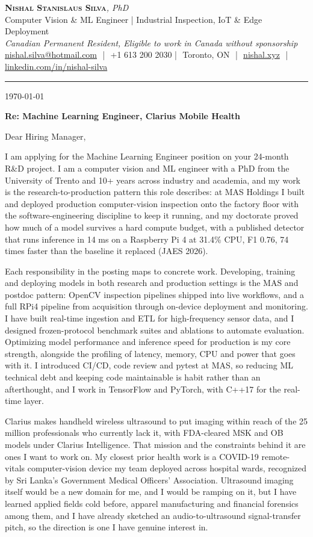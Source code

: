 \documentclass[11pt]{article}
\makeatletter
\newcommand{\clName}{Nishal Stanislaus Silva}
\newcommand{\clEmail}{nishal.silva@hotmail.com}
\newcommand{\clPhone}{+1 613 200 2030}
\newcommand{\clCity}{Toronto, ON}
\newcommand{\clSite}{https://nishal.xyz}
\newcommand{\clLinkedIn}{https://www.linkedin.com/in/nishal-silva}
\newcommand{\clStatus}{Canadian Permanent Resident, Eligible to work in Canada without sponsorship}
\newcommand{\clTagline}{Computer Vision \& ML Engineer | Industrial Inspection, IoT \& Edge Deployment}
\newcommand{\clRole}{Machine Learning Engineer}
\newcommand{\clCompany}{Clarius Mobile Health}
\newcommand{\clAddressee}{Dear Hiring Manager,}
\makeatother
\begin{document}
\pagestyle{empty}
\begin{center}
    {\LARGE \scshape \textbf{\clName}}{\large \textit{, PhD}}\\[1pt]
    {\small \clTagline}\\[1pt]
    {\footnotesize\textit{\clStatus}}\\[1pt]
    {\small
    \href{mailto:\clEmail}{\clEmail} \,\,|\,\, \clPhone \,\,|\,\, \clCity
    \,\,|\,\, \href{\clSite}{nishal.xyz} \,\,|\,\, \href{\clLinkedIn}{linkedin.com/in/nishal-silva}}
\end{center}

\rule{\linewidth}{0.4pt}\vspace{0.6em}

\today

\textbf{Re: \clRole{}, \clCompany{}}

\clAddressee

I am applying for the Machine Learning Engineer position on your 24-month R\&D project. I am a computer vision and ML engineer with a PhD from the University of Trento and 10+ years across industry and academia, and my work is the research-to-production pattern this role describes: at MAS Holdings I built and deployed production computer-vision inspection onto the factory floor with the software-engineering discipline to keep it running, and my doctorate proved how much of a model survives a hard compute budget, with a published detector that runs inference in 14 ms on a Raspberry Pi 4 at 31.4\% CPU, F1 0.76, 74 times faster than the baseline it replaced (JAES 2026).

Each responsibility in the posting maps to concrete work. Developing, training and deploying models in both research and production settings is the MAS and postdoc pattern: OpenCV inspection pipelines shipped into live workflows, and a full RPi4 pipeline from acquisition through on-device deployment and monitoring. I have built real-time ingestion and ETL for high-frequency sensor data, and I designed frozen-protocol benchmark suites and ablations to automate evaluation. Optimizing model performance and inference speed for production is my core strength, alongside the profiling of latency, memory, CPU and power that goes with it. I introduced CI/CD, code review and pytest at MAS, so reducing ML technical debt and keeping code maintainable is habit rather than an afterthought, and I work in TensorFlow and PyTorch, with C++17 for the real-time layer.

Clarius makes handheld wireless ultrasound to put imaging within reach of the 25 million professionals who currently lack it, with FDA-cleared MSK and OB models under Clarius Intelligence. That mission and the constraints behind it are ones I want to work on. My closest prior health work is a COVID-19 remote-vitals computer-vision device my team deployed across hospital wards, recognized by Sri Lanka's Government Medical Officers' Association. Ultrasound imaging itself would be a new domain for me, and I would be ramping on it, but I have learned applied fields cold before, apparel manufacturing and financial forensics among them, and I have already sketched an audio-to-ultrasound signal-transfer pitch, so the direction is one I have genuine interest in.
\end{document}
